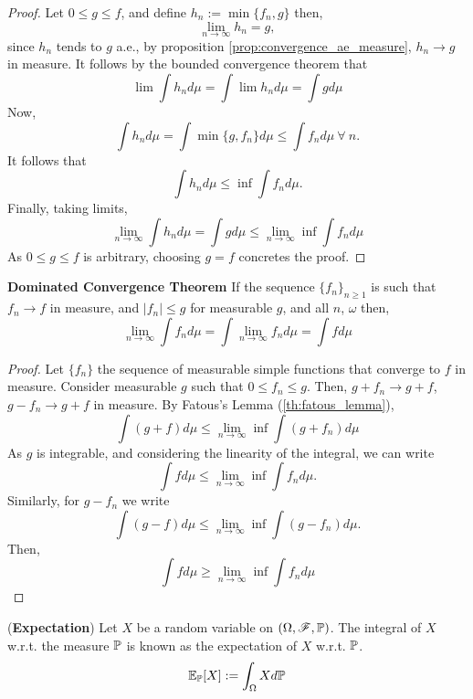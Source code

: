 \documentclass[../TGMAFFIRO.tex]{subfiles}
\begin{document}
\begin{proof}
	Let $0 \leq g \leq f$, and define $h_n:= \min\{f_n, g\}$ then,
	\[
		\lim_{n\to\infty} h_n = g,
	\]
	since $h_n$ tends to $g$ a.e., by proposition \ref{prop:convergence_ae_measure}, $h_n \to g$ in measure. It follows by the bounded convergence theorem that
	\begin{equation}
		\lim \int h_n d\mu = \int \lim h_n d\mu = \int g d\mu
	\end{equation}
	Now, 
	\[
		\int h_n d\mu = \int \min\{g, f_n\} d\mu \leq \int f_n d	\mu \ \forall \ n.
	\]
	It follows that
	\[
		\int h_n d\mu \leq \inf\int f_n d\mu.
	\]
	Finally, taking limits,
	\[
		\lim_{n\to\infty} \int h_n d\mu = \int g d\mu \leq \lim_{n\to\infty}\inf \int f_n d\mu
	\]
	As $0 \leq g \leq f$ is arbitrary, choosing $g = f$ concretes the proof.
\end{proof}

\begin{theorem} \textbf{Dominated Convergence Theorem}
If the sequence $\{f_n\}_{n\geq 1}$ is such that $f_n \to f$ in measure, and $|f_n| \leq g$ for measurable $g$, and all $n$, $\omega$ then,
\begin{equation}
	\lim_{n\to\infty}\int f_n d\mu = \int \lim_{n\to\infty} f_n d\mu  = \int f d\mu
\end{equation}
\end{theorem}

\begin{proof}
	Let $\{f_n\}$ the sequence of measurable simple functions that converge to $f$ in measure. Consider measurable $g$ such that $0 \leq f_n \leq g$. Then, $g + f_n \to g + f$, $g - f_n \to g + f$ in measure. By Fatous's Lemma (\ref	{th:fatous_lemma}),
	\[
		\int(g + f) d\mu \leq \lim_{n\to\infty}\inf\int(g + f_n) d\mu
	\]	
	As $g$ is integrable, and considering the linearity of the integral, we can write
	\[
		\int f d\mu \leq \lim_{n\to\infty}\inf\int f_n d\mu.
	\]
	Similarly, for $g - f_n$ we write
	\[
		\int(g - f) d\mu \leq \lim_{n\to\infty} \inf \int (g - f_n) d\mu.
	\]
	Then,
	\[
		\int f d\mu \geq \lim_{n\to\infty} \inf \int f_n d\mu
	\]
\end{proof}


\begin{definition} (\textbf{Expectation})
	Let $X$ be a random variable on $(\Omega, \mathscr{F}, \mathbb{P})$. The integral of $X$ w.r.t. the measure $\mathbb{P}$ is known as the expectation of $X$ w.r.t. $\mathbb{P}$. 
	\begin{equation}
		\mathbb{E}_{\mathbb{P}}[X] := \int_\Omega X d\mathbb{P}
	\end{equation}
\end{definition}
\end{document}
